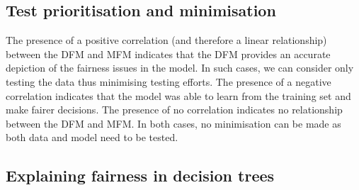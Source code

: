 \documentclass{article}
\begin{document}

\subsection{Test prioritisation and
  minimisation}\label{sec:discuss-test-prior-min}


The presence of a positive correlation (and therefore a linear
relationship) between the DFM and MFM indicates that the DFM provides
an accurate depiction of the fairness issues in the model. In such
cases, we can consider only testing the data thus minimising testing
efforts. The presence of a negative correlation indicates that the
model was able to learn from the training set and make fairer
decisions. The presence of no correlation indicates no relationship
between the DFM and MFM. In both cases, no minimisation can be made as
both data and model need to be tested.







\subsection{Explaining fairness in decision trees}\label{sec:discuss-explain-fair-dt}
\end{document}
